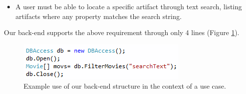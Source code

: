 \begin{itemize}
\item A user must be able to locate a specific artifact through text search,
	listing artifacts where any property matches the search string.
\end{itemize}

Our back-end supports the above requirement through only 4 lines (Figure \ref{fig:moviesearch}).

\begin{figure}[hbt]
	\centering
	\includegraphics[scale=0.81]{./p1design/moviesearch.png}
	\caption{Example use of our back-end structure in the context of a use case.}
	\label{fig:moviesearch}
\end{figure}
